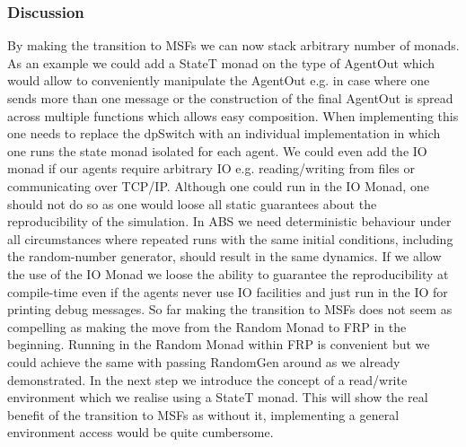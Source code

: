 \subsubsection{Discussion}
By making the transition to MSFs we can now stack arbitrary number of monads. As an example we could add a StateT monad on the type of AgentOut which would allow to conveniently manipulate the AgentOut e.g. in case where one sends more than one message or the construction of the final AgentOut is spread across multiple functions which allows easy composition. When implementing this one needs to replace the dpSwitch with an individual implementation in which one runs the state monad isolated for each agent.
We could even add the IO monad if our agents require arbitrary IO e.g. reading/writing from files or communicating over TCP/IP. Although one could run in the IO Monad, one should not do so as one would loose all static guarantees about the reproducibility of the simulation. In ABS we need deterministic behaviour under all circumstances where repeated runs with the same initial conditions, including the random-number generator, should result in the same dynamics. If we allow the use of the IO Monad we loose the ability to guarantee the reproducibility at compile-time even if the agents never use IO facilities and just run in the IO for printing debug messages.
So far making the transition to MSFs does not seem as compelling as making the move from the Random Monad to FRP in the beginning. Running in the Random Monad within FRP is convenient but we could achieve the same with passing RandomGen around as we already demonstrated. In the next step we introduce the concept of a read/write environment which we realise using a StateT monad. This will show the real benefit of the transition to MSFs as without it, implementing a general environment access would be quite cumbersome.